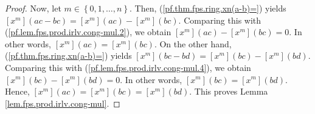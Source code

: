 \begin{proof}
Now, let $m\in\left\{  0,1,\ldots,n\right\}  $. Then,
(\ref{pf.thm.fps.ring.xn(a-b)=}) yields $\left[  x^{m}\right]  \left(
ac-bc\right)  =\left[  x^{m}\right]  \left(  ac\right)  -\left[  x^{m}\right]
\left(  bc\right)  $. Comparing this with
(\ref{pf.lem.fps.prod.irlv.cong-mul.2}), we obtain $\left[  x^{m}\right]
\left(  ac\right)  -\left[  x^{m}\right]  \left(  bc\right)  =0$. In other
words, $\left[  x^{m}\right]  \left(  ac\right)  =\left[  x^{m}\right]
\left(  bc\right)  $. On the other hand, (\ref{pf.thm.fps.ring.xn(a-b)=})
yields $\left[  x^{m}\right]  \left(  bc-bd\right)  =\left[  x^{m}\right]
\left(  bc\right)  -\left[  x^{m}\right]  \left(  bd\right)  $. Comparing this
with (\ref{pf.lem.fps.prod.irlv.cong-mul.4}), we obtain $\left[  x^{m}\right]
\left(  bc\right)  -\left[  x^{m}\right]  \left(  bd\right)  =0$. In other
words, $\left[  x^{m}\right]  \left(  bc\right)  =\left[  x^{m}\right]
\left(  bd\right)  $. Hence, $\left[  x^{m}\right]  \left(  ac\right)
=\left[  x^{m}\right]  \left(  bc\right)  =\left[  x^{m}\right]  \left(
bd\right)  $. This proves Lemma \ref{lem.fps.prod.irlv.cong-mul}.
\end{proof}
